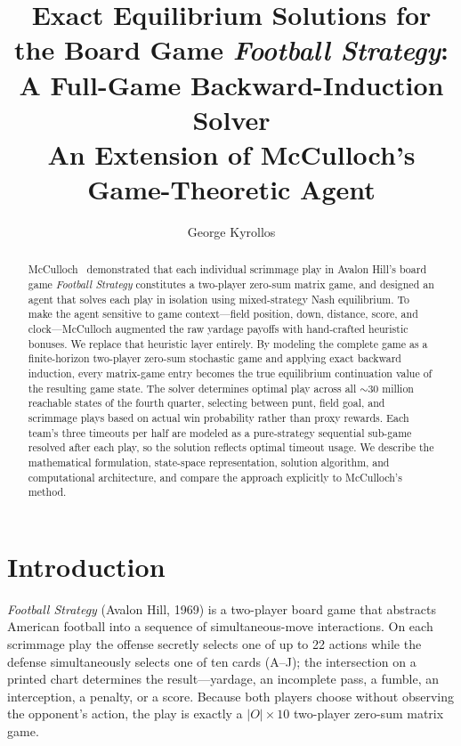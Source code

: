 \documentclass[11pt,letterpaper]{article}
\title{\textbf{Exact Equilibrium Solutions for the Board Game \emph{Football Strategy}:
A Full-Game Backward-Induction Solver}\\[6pt]
\large An Extension of McCulloch's Game-Theoretic Agent}
\author{George Kyrollos}
\date{}
\begin{document}
\maketitle

\begin{abstract}
McCulloch~\cite{mcculloch} demonstrated that each individual scrimmage play in Avalon
Hill's board game \emph{Football Strategy} constitutes a two-player zero-sum matrix game,
and designed an agent that solves each play in isolation using mixed-strategy Nash
equilibrium.  To make the agent sensitive to game context---field position, down, distance,
score, and clock---McCulloch augmented the raw yardage payoffs with hand-crafted heuristic
bonuses.  We replace that heuristic layer entirely.  By modeling the complete game as a
finite-horizon two-player zero-sum stochastic game and applying exact backward induction,
every matrix-game entry becomes the true equilibrium continuation value of the resulting
game state.  The solver determines optimal play across all ${\sim}30$ million reachable
states of the fourth quarter, selecting between punt, field goal, and scrimmage plays based
on actual win probability rather than proxy rewards.  Each team's three timeouts per half are modeled as a pure-strategy sequential
sub-game resolved after each play, so the solution reflects optimal timeout usage.  We describe the
mathematical formulation, state-space representation, solution algorithm, and computational
architecture, and compare the approach explicitly to McCulloch's method.
\end{abstract}

\section{Introduction}
\label{sec:intro}

\emph{Football Strategy} (Avalon Hill, 1969) is a two-player board game that abstracts
American football into a sequence of simultaneous-move interactions.  On each scrimmage
play the offense secretly selects one of up to 22 actions while the defense simultaneously
selects one of ten cards (A--J); the intersection on a printed chart determines the
result---yardage, an incomplete pass, a fumble, an interception, a penalty, or a score.
Because both players choose without observing the opponent's action, the play is exactly a
$|O|\times 10$ two-player zero-sum matrix game.
\end{document}
